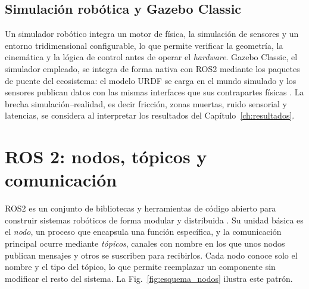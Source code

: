 \subsection{Simulación robótica y Gazebo Classic}
\label{sec:simuladores_marco}

Un simulador robótico integra un motor de física, la simulación de sensores y un entorno tridimensional configurable, lo que permite verificar la geometría, la cinemática y la lógica de control antes de operar el \textit{hardware}. Gazebo Classic, el simulador empleado, se integra de forma nativa con \gls{ROS2}
mediante los paquetes de puente del ecosistema: el modelo URDF se carga en el
mundo simulado y los sensores publican datos con las mismas interfaces que sus
contrapartes físicas \citep{osrf2025gazeboclassic}. La brecha simulación--realidad, es decir fricción, zonas muertas, ruido sensorial y latencias, se considera al interpretar los resultados del Capítulo~\ref{ch:resultados}.

\section{ROS 2: nodos, tópicos y comunicación}
\label{sec:ros2_marco}

\gls{ROS2} es un conjunto de bibliotecas y herramientas de código abierto
para construir sistemas robóticos de forma modular y distribuida
\citep{macenski2022ros2}. Su unidad básica es el \emph{nodo}, un proceso que
encapsula una función específica, y la comunicación principal ocurre mediante
\emph{tópicos}, canales con nombre en los que unos nodos publican mensajes y
otros se suscriben para recibirlos. Cada nodo conoce solo el nombre y el tipo
del tópico, lo que permite reemplazar un componente sin modificar el resto del
sistema. La Fig.~\ref{fig:esquema_nodos} ilustra este patrón.

